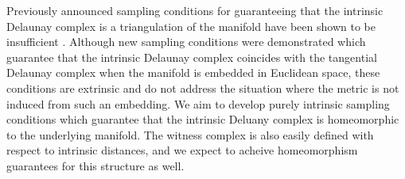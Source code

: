 Previously announced sampling conditions \cite{leibon2000} for
guaranteeing that the intrinsic Delaunay complex is a triangulation of
the manifold have been shown to be insufficient
\cite{boissonnat2012stab}. Although new sampling conditions were
demonstrated which guarantee that the intrinsic Delaunay complex
coincides with the tangential Delaunay complex when the manifold is
embedded in Euclidean space, these conditions are extrinsic and do not
address the situation where the metric is not induced from such an
embedding. We aim to develop purely intrinsic sampling conditions
which guarantee that the intrinsic Deluany complex is homeomorphic to
the underlying manifold. The witness complex is also easily defined
with respect to intrinsic distances, and we expect to acheive
homeomorphism guarantees for this structure as well.











%











